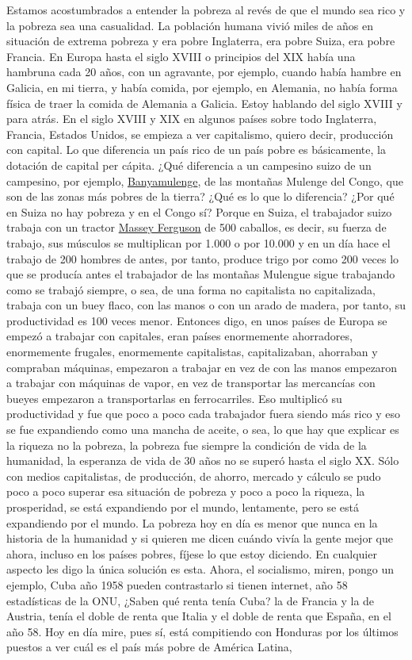 Estamos acostumbrados a entender la pobreza al revés de que el mundo sea rico y la pobreza sea una casualidad. La población humana vivió miles de años en situación de extrema pobreza y era pobre Inglaterra, era pobre Suiza, era pobre Francia. En Europa hasta el siglo XVIII o principios del XIX había una hambruna cada 20 años, con un agravante, por ejemplo, cuando había hambre en Galicia, en mi tierra, y había comida, por ejemplo, en Alemania, no había forma física de traer la comida de Alemania a Galicia. Estoy hablando del siglo XVIII y para atrás. En el siglo XVIII y XIX en algunos países sobre todo Inglaterra, Francia, Estados Unidos, se empieza a ver capitalismo, quiero decir, producción con capital. Lo que diferencia un país rico de un país pobre es básicamente, la dotación de capital per cápita. ¿Qué diferencia a un campesino suizo de un campesino, por ejemplo, \href{https://en.wikipedia.org/wiki/Banyamulenge}{Banyamulenge}, de las montañas Mulenge del Congo, que son de las zonas más pobres de la tierra? ¿Qué es lo que lo diferencia? ¿Por qué en Suiza no hay pobreza y en el Congo sí? Porque en Suiza, el trabajador suizo trabaja con un tractor \href{https://en.wikipedia.org/wiki/Massey_Ferguson}{Massey Ferguson} de 500 caballos, es decir, su fuerza de trabajo, sus músculos se multiplican por 1.000 o por 10.000 y en un día hace el trabajo de 200 hombres de antes, por tanto, produce trigo por como 200 veces lo que se producía antes el trabajador de las montañas Mulengue sigue trabajando como se trabajó siempre, o sea, de una forma no capitalista no capitalizada, trabaja con un buey flaco, con las manos o con un arado de madera, por tanto, su productividad es 100 veces menor. Entonces digo, en unos países de Europa se empezó a trabajar con capitales, eran países enormemente ahorradores, enormemente frugales, enormemente capitalistas, capitalizaban, ahorraban y compraban máquinas, empezaron a trabajar en vez de con las manos empezaron a trabajar con máquinas de vapor, en vez de transportar las mercancías con bueyes empezaron a transportarlas en ferrocarriles. Eso multiplicó su productividad y fue que poco a poco cada trabajador fuera siendo más rico y eso se fue expandiendo como una mancha de aceite, o sea, lo que hay que explicar es la riqueza no la pobreza, la pobreza fue siempre la condición de vida de la humanidad, la esperanza de vida de 30 años no se superó hasta el siglo XX. Sólo con medios capitalistas, de producción, de ahorro, mercado y cálculo se pudo poco a poco superar esa situación de pobreza y poco a poco la riqueza, la prosperidad, se está expandiendo por el mundo, lentamente, pero se está expandiendo por el mundo. La pobreza hoy en día es menor que nunca en la historia de la humanidad y si quieren me dicen cuándo vivía la gente mejor que ahora, incluso en los países pobres, fíjese lo que estoy diciendo. En cualquier aspecto les digo la única solución es esta. Ahora, el socialismo, miren, pongo un ejemplo, Cuba año 1958 pueden contrastarlo si tienen internet, año 58 estadísticas de la ONU, ¿Saben qué renta tenía Cuba? la de Francia y la de Austria, tenía el doble de renta que Italia y el doble de renta que España, en el año 58. Hoy en día mire, pues sí, está compitiendo con Honduras por los últimos puestos a ver cuál es el país más pobre de América Latina, 